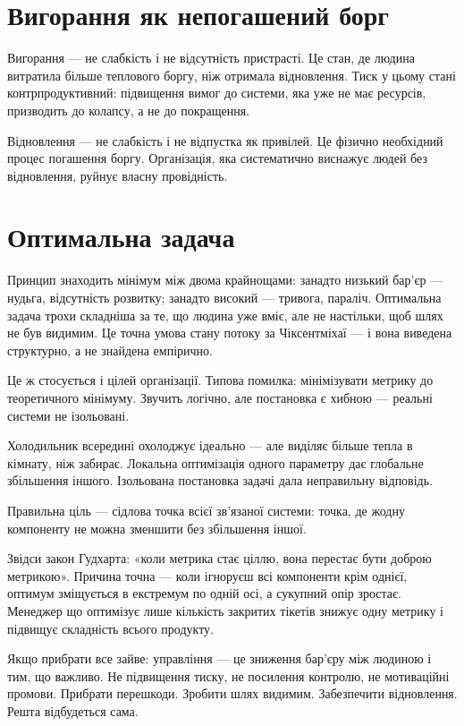 \documentclass[12pt, a4paper, openany]{book}
\begin{document}
\section{Вигорання як непогашений борг}

Вигорання --- не слабкість і не відсутність пристрасті. Це стан, де людина витратила більше теплового боргу, ніж отримала відновлення. Тиск у цьому стані контрпродуктивний: підвищення вимог до системи, яка уже не має ресурсів, призводить до колапсу, а не до покращення.

Відновлення --- не слабкість і не відпустка як привілей. Це фізично необхідний процес погашення боргу. Організація, яка систематично виснажує людей без відновлення, руйнує власну провідність.

\section{Оптимальна задача}

Принцип знаходить мінімум між двома крайнощами: занадто низький бар'єр --- нудьга, відсутність розвитку; занадто високий --- тривога, параліч. Оптимальна задача трохи складніша за те, що людина уже вміє, але не настільки, щоб шлях не був видимим. Це точна умова стану потоку за Чіксентміхаї --- і вона виведена структурно, а не знайдена емпірично.

Це ж стосується і цілей організації. Типова помилка: мінімізувати метрику до теоретичного мінімуму. Звучить логічно, але постановка є хибною — реальні системи не ізольовані.

\begin{analogybox}
Холодильник всередині охолоджує ідеально --- але виділяє більше тепла в кімнату, ніж забирає. Локальна оптимізація одного параметру дає глобальне збільшення іншого. Ізольована постановка задачі дала неправильну відповідь.
\end{analogybox}

Правильна ціль --- сідлова точка всієї зв'язаної системи: точка, де жодну компоненту не можна зменшити без збільшення іншої.

Звідси закон Гудхарта: «коли метрика стає ціллю, вона перестає бути доброю метрикою». Причина точна — коли ігноруєш всі компоненти крім однієї, оптимум зміщується в екстремум по одній осі, а сукупний опір зростає. Менеджер що оптимізує лише кількість закритих тікетів знижує одну метрику і підвищує складність всього продукту.

Якщо прибрати все зайве: управління --- це зниження бар'єру між людиною і тим, що важливо. Не підвищення тиску, не посилення контролю, не мотиваційні промови. Прибрати перешкоди. Зробити шлях видимим. Забезпечити відновлення. Решта відбудеться сама.
\end{document}
